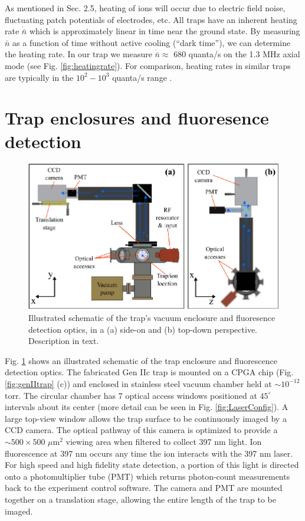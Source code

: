 As mentioned in Sec. 2.5, heating of ions will occur due to electric field noise, fluctuating patch potentials of electrodes, etc. All traps have an inherent heating rate $\dot{\bar{n}}$ which is approximately linear in time near the ground state. By measuring $\bar{n}$ as a function of time without active cooling (``dark time''), we can determine the heating rate. In our trap we measure $\dot{\bar{n}} \approx$ 680 quanta/s on the 1.3 MHz axial mode (see Fig. \ref{fig:heatingrate}). For comparison, heating rates in similar traps are typically in the $10^2 - 10^3$ quanta/s range \cite{doi:10.1063/1.4917385, PhysRevLett.96.253003, PhysRevA.76.033411, Shu14.PRA.89.062308}.

\section{Trap enclosures and fluoresence detection}

\begin{figure}[t]
    \begin{center}
        \includegraphics{figures/3/Fig_CameraConfigR}
        \caption{\label{fig:CameraConfig} Illustrated schematic of the trap's vacuum enclosure and fluoresence detection optics, in a (a) side-on and (b) top-down perspective. Description in text.   }
    \end{center}
\end{figure}


Fig. \ref{fig:CameraConfig} shows an illustrated schematic of the trap enclosure and fluorescence detection optics. The fabricated Gen IIc trap is mounted on a CPGA chip (Fig. \ref{fig:genIItrap} (c)) and enclosed in stainless steel vacuum chamber held at $\sim 10^{-12}$ torr. The circular chamber has 7 optical access windows positioned at $45^{\circ}$ intervals about its center (more detail can be seen in Fig. \ref{fig:LaserConfig}). A large top-view window allows the trap surface to be continuously imaged by a CCD camera. The optical pathway of this camera is optimized to provide a $\sim 500 \times 500$ $\mu$m$^2$ viewing area when filtered to collect 397 nm light. Ion fluorescence at 397 nm occurs any time the ion interacts with the 397 nm laser. For high speed and high fidelity state detection, a portion of this light is directed onto a photomultiplier tube (PMT) which returns photon-count measurements back to the experiment control software. The camera and PMT are mounted together on a translation stage, allowing the entire length of the trap to be imaged. 

